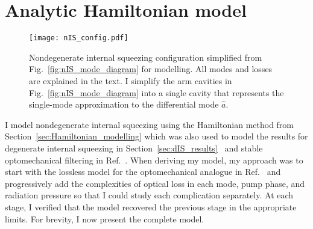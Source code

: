 \section{Analytic Hamiltonian model}
\label{sec:nIS_model}

\begin{figure}[ht]
	\centering
	\texttt{[image: nIS\_config.pdf]}
	\caption{Nondegenerate internal squeezing configuration simplified from Fig.~\ref{fig:nIS_mode_diagram} for modelling. All modes and losses are explained in the text. I simplify the arm cavities in Fig.~\ref{fig:nIS_mode_diagram} into a single cavity that represents the single-mode approximation to the differential mode $\hat a$.}
	\label{fig:nIS_config}
\end{figure}

I model nondegenerate internal squeezing using the Hamiltonian method from Section~\ref{sec:Hamiltonian_modelling} which was also used to model the results for degenerate internal squeezing in Section~\ref{sec:dIS_results}~\cite{korobkoQuantumExpanderGravitationalwave2019} and stable optomechanical filtering in Ref.~\cite{liBroadbandSensitivityImprovement2020}. %
When deriving my model, my approach was to start with the lossless model for the optomechanical analogue in Ref.~\cite{liBroadbandSensitivityImprovement2020} and progressively add the complexities of optical loss in each mode, pump phase, and radiation pressure so that I could study each complication separately. At each stage, I verified that the model recovered the previous stage in the appropriate limits. For brevity, I now present the complete model.

